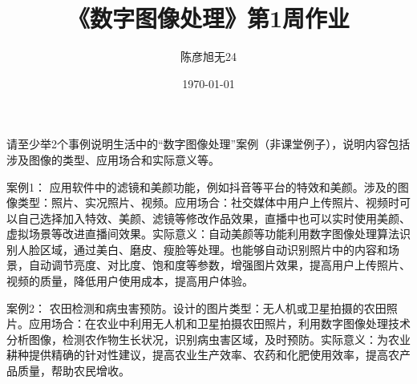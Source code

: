 \documentclass[a4paper]{article}
\title{\heiti 《数字图像处理》第1周作业}
\author{陈彦旭\;无24}
\date{\today}
\begin{document}
\maketitle

请至少举2个事例说明生活中的“数字图像处理”案例（非课堂例子），说明内容包括涉及图像的类型、应用场合和实际意义等。


案例1：
应用软件中的滤镜和美颜功能，例如抖音等平台的特效和美颜。涉及的图像类型：照片、实况照片、视频。应用场合：社交媒体中用户上传照片、视频时可以自己选择加入特效、美颜、滤镜等修改作品效果，直播中也可以实时使用美颜、虚拟场景等改进直播间效果。实际意义：自动美颜等功能利用数字图像处理算法识别人脸区域，通过美白、磨皮、瘦脸等处理。也能够自动识别照片中的内容和场景，自动调节亮度、对比度、饱和度等参数，增强图片效果，提高用户上传照片、视频的质量，降低用户使用成本，提高用户体验。


案例2：
农田检测和病虫害预防。设计的图片类型：无人机或卫星拍摄的农田照片。应用场合：在农业中利用无人机和卫星拍摄农田照片，利用数字图像处理技术分析图像，检测农作物生长状况，识别病虫害区域，及时预防。实际意义：为农业耕种提供精确的针对性建议，提高农业生产效率、农药和化肥使用效率，提高农产品质量，帮助农民增收。
\end{document}
